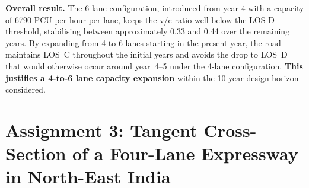 \documentclass[11pt]{article}
\begin{document}
\begin{table}[H]
  \centering
  \caption{Design volume, v/c ratio, and LOS over 10 years for the 4-lane and 6-lane divided configurations, based on the 85th-percentile volume.}
\end{table}

\textbf{Overall result.} The 6-lane configuration, introduced from year 4 with a capacity of 6790
PCU per hour per lane, keeps the v/c ratio well below the LOS-D threshold, stabilising between approximately
0.33 and 0.44 over the remaining years. By expanding from 4 to 6 lanes starting in the present year, the
road maintains LOS~C throughout the initial years and avoids the drop to LOS~D that would otherwise occur
around year~4--5 under the 4-lane configuration. \textbf{This justifies a 4-to-6 lane capacity expansion}
within the 10-year design horizon considered.

\clearpage
\section{Assignment 3: Tangent Cross-Section of a Four-Lane Expressway in North-East India}
\end{document}

